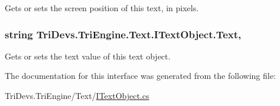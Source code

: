 Gets or sets the screen position of this text, in pixels. 

\hypertarget{interface_tri_devs_1_1_tri_engine_1_1_text_1_1_i_text_object_a3174625e154cefa41e4ed4540e736035}{
\subsubsection[{Text}]{\setlength{\rightskip}{0pt plus 5cm}string Tri\-Devs.\-Tri\-Engine.\-Text.\-I\-Text\-Object.\-Text\hspace{0.3cm}{\ttfamily [get]}, {\ttfamily [set]}}}\label{interface_tri_devs_1_1_tri_engine_1_1_text_1_1_i_text_object_a3174625e154cefa41e4ed4540e736035}


Gets or sets the text value of this text object. 



The documentation for this interface was generated from the following file\-:\begin{DoxyCompactItemize}
\item 
Tri\-Devs.\-Tri\-Engine/\-Text/\hyperlink{_i_text_object_8cs}{I\-Text\-Object.\-cs}\end{DoxyCompactItemize}
